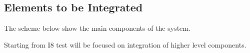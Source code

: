 \documentclass[a4paper,11pt]{report} %
\begin{document}
	\subsection{Elements to be Integrated}
		The scheme below show the main components of the system.\\
			\begin{minipage}{\linewidth}
			\end{minipage}
			Starting from I8 test will be focused on integration of higher level components.
\end{document}
